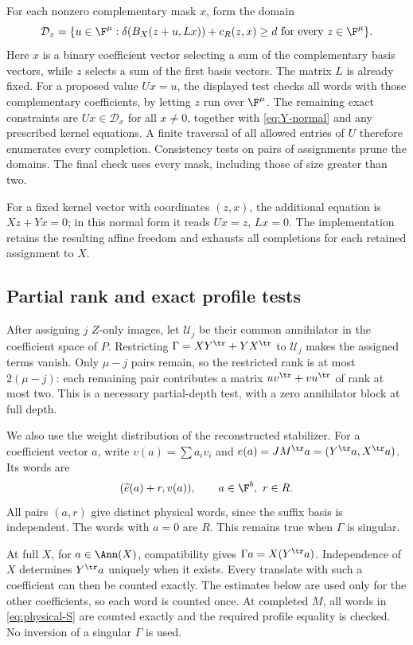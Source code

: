 For each nonzero complementary mask \(x\), form the domain
\[
 \mathcal D_x=\{u\in\F^\mu:\delta(B_X(z+u,Lx))+
                       c_R(z,x)\geq d\text{ for every }z\in\F^\mu\}.
\]
Here \(x\) is a binary coefficient vector selecting a sum of the
complementary basis vectors, while \(z\) selects a sum of the first
basis vectors. The matrix \(L\) is already fixed. For a proposed value
\(Ux=u\), the displayed test checks all words with those complementary
coefficients, by letting \(z\) run over \(\F^\mu\).
The remaining exact constraints are \(Ux\in\mathcal D_x\) for all
\(x\ne0\), together with \eqref{eq:Y-normal} and any prescribed
kernel equations. A finite traversal of all allowed entries of \(U\)
therefore enumerates every completion. Consistency tests on pairs of assignments prune the domains. The final
check uses every mask, including those of size greater than two.

For a fixed kernel vector with coordinates \((z,x)\), the additional
equation is \(Xz+Yx=0\); in this normal form it reads
\(Ux=z\), \(Lx=0\). The implementation retains the resulting affine
freedom and exhausts all completions for each retained assignment to
\(X\).

\subsection{Partial rank and exact profile tests}\label{sec:profile}

After assigning \(j\) \(Z\)-only images, let \(\mathcal U_j\) be their common
annihilator in the coefficient space of \(P\). Restricting
\(\Gamma=XY^\tr+YX^\tr\) to \(\mathcal U_j\) makes the assigned terms vanish.
Only \(\mu-j\) pairs remain, so the restricted rank is at most
\(2(\mu-j)\): each remaining pair contributes a matrix
\(uv^\tr+vu^\tr\) of rank at most two. This is a necessary partial-depth test, with a zero
annihilator block at full depth.

We also use the weight distribution of the reconstructed stabilizer.
For a coefficient vector \(a\), write
\(v(a)=\sum a_iv_i\) and
\(e(a)=JM^\tr a=(Y^\tr a,X^\tr a)\). Its words are
\begin{equation}\label{eq:physical-S}
 (\widetilde e(a)+r,v(a)),\qquad a\in\F^b,\ r\in R.
\end{equation}
All pairs \((a,r)\) give distinct physical words, since the suffix basis
is independent. The words with \(a=0\) are \(R\).
This remains true when \(\Gamma\) is singular.

At full \(X\), for \(a\in\Ann(X)\), compatibility gives
\(\Gamma a=X(Y^\tr a)\). Independence of \(X\) determines
\(Y^\tr a\) uniquely when it exists. Every translate with such a coefficient can then be counted exactly.
The estimates below are used only for the other coefficients, so each
word is counted once. At completed \(M\),
all words in \eqref{eq:physical-S} are counted exactly and the required
profile equality is checked. No inversion of a singular \(\Gamma\)
is used.

